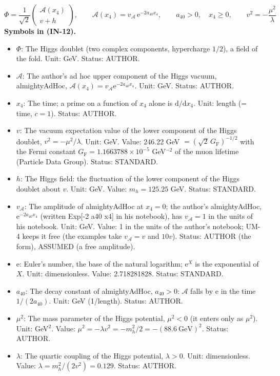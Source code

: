 \documentclass[
  10pt,
]{article}
\providecommand{\tightlist}{%
  \setlength{\itemsep}{0pt}\setlength{\parskip}{0pt}}
\begin{document}
\[
\Phi = \frac{1}{\sqrt2}\begin{pmatrix}\mathcal{A}(x_4)\\ v + h\end{pmatrix},\qquad
\mathcal{A}(x_4) = v_{\mathcal{A}}\,\mathrm{e}^{-2a_{40}x_4},\qquad a_{40} > 0,\quad x_4 \ge 0,\qquad v^2 = -\frac{\mu^2}{\lambda} \tag{IN-12}
\] \textbf{Symbols in (IN-12).}

\begin{itemize}
\tightlist
\item
  \(\Phi\): The Higgs doublet (two complex components, hypercharge
  \(1/2\)), a field of the fold. Unit: GeV. Status: AUTHOR.
\item
  \(\mathcal{A}\): The author's ad hoc upper component of the Higgs
  vacuum, almightyAdHoc,
  \(\mathcal{A}(x_4) = v_{\mathcal{A}}\mathrm{e}^{-2a_{40}x_4}\). Unit:
  GeV. Status: AUTHOR.
\item
  \(x_4\): The time; a prime on a function of \(x_4\) alone is
  \(\mathrm{d}/\mathrm{d}x_4\). Unit: length (= time, \(c = 1\)).
  Status: AUTHOR.
\item
  \(v\): The vacuum expectation value of the lower component of the
  Higgs doublet, \(v^2 = -\mu^2/\lambda\). Unit: GeV. Value: 246.22 GeV
  \(= (\sqrt2\,G_{\mathrm{F}})^{-1/2}\) with the Fermi constant
  \(G_{\mathrm{F}} = 1.1663788\times10^{-5}\) GeV\(^{-2}\) of the muon
  lifetime (Particle Data Group). Status: STANDARD.
\item
  \(h\): The Higgs field: the fluctuation of the lower component of the
  Higgs doublet about \(v\). Unit: GeV. Value: \(m_h = 125.25\) GeV.
  Status: STANDARD.
\item
  \(v_{\mathcal{A}}\): The amplitude of almightyAdHoc at \(x_4 = 0\);
  the author's almightyAdHoc, \(\mathrm{e}^{-2a_{40}x_4}\) (written
  Exp{[}-2 a40 x4{]} in his notebook), has \(v_{\mathcal{A}} = 1\) in
  the units of his notebook. Unit: GeV. Value: 1 in the units of the
  author's notebook; UM-4 keeps it free (the examples take
  \(v_{\mathcal{A}} = v\) and \(10v\)). Status: AUTHOR (the form),
  ASSUMED (a free amplitude).
\item
  \(\mathrm{e}\): Euler's number, the base of the natural logarithm;
  \(\mathrm{e}^{X}\) is the exponential of \(X\). Unit: dimensionless.
  Value: 2.718281828. Status: STANDARD.
\item
  \(a_{40}\): The decay constant of almightyAdHoc, \(a_{40} > 0\):
  \(\mathcal{A}\) falls by \(\mathrm{e}\) in the time \(1/(2a_{40})\).
  Unit: GeV (1/length). Status: AUTHOR.
\item
  \(\mu^2\): The mass parameter of the Higgs potential, \(\mu^2 < 0\)
  (it enters only as \(\mu^2\)). Unit: GeV\(^2\). Value:
  \(\mu^2 = -\lambda v^2 = -m_h^2/2 = -(88.6\ \mathrm{GeV})^2\). Status:
  AUTHOR.
\item
  \(\lambda\): The quartic coupling of the Higgs potential,
  \(\lambda > 0\). Unit: dimensionless. Value:
  \(\lambda = m_h^2/(2v^2) = 0.129\). Status: AUTHOR.
\end{itemize}
\end{document}

